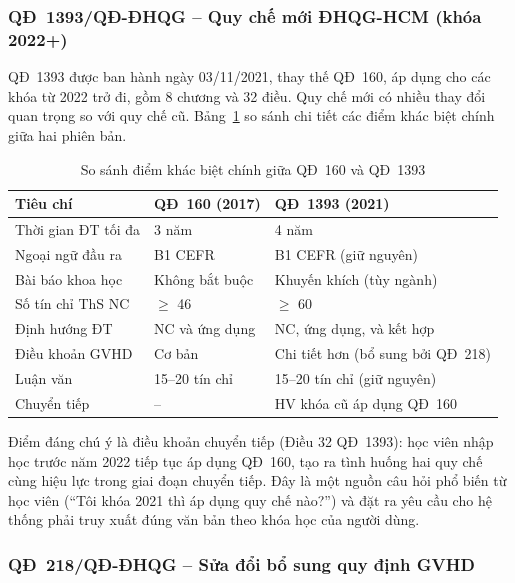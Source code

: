 \subsubsection*{QĐ~1393/QĐ-ĐHQG -- Quy chế mới ĐHQG-HCM (khóa 2022+)}

QĐ~1393 được ban hành ngày 03/11/2021, thay thế QĐ~160, áp dụng cho các khóa từ
2022 trở đi, gồm 8 chương và 32 điều. Quy chế mới có nhiều thay đổi quan trọng so
với quy chế cũ. Bảng~\ref{tab:qd160_vs_qd1393} so sánh chi tiết các điểm khác biệt
chính giữa hai phiên bản.

\begin{table}[htbp]
    \centering
    \caption{So sánh điểm khác biệt chính giữa QĐ~160 và QĐ~1393}
    \label{tab:qd160_vs_qd1393}
    \begin{tabular}{lp{4.5cm}p{4.5cm}}
        \toprule
        \textbf{Tiêu chí} & \textbf{QĐ~160 (2017)} & \textbf{QĐ~1393 (2021)} \\
        \midrule
        Thời gian ĐT tối đa & 3 năm & 4 năm \\
        Ngoại ngữ đầu ra & B1 CEFR & B1 CEFR (giữ nguyên) \\
        Bài báo khoa học & Không bắt buộc & Khuyến khích (tùy ngành) \\
        Số tín chỉ ThS NC & $\geq$ 46 & $\geq$ 60 \\
        Định hướng ĐT & NC và ứng dụng & NC, ứng dụng, và kết hợp \\
        Điều khoản GVHD & Cơ bản & Chi tiết hơn (bổ sung bởi QĐ~218) \\
        Luận văn & 15--20 tín chỉ & 15--20 tín chỉ (giữ nguyên) \\
        Chuyển tiếp & -- & HV khóa cũ áp dụng QĐ~160 \\
        \bottomrule
    \end{tabular}
\end{table}

Điểm đáng chú ý là điều khoản chuyển tiếp (Điều 32 QĐ~1393): học viên nhập học
trước năm 2022 tiếp tục áp dụng QĐ~160, tạo ra tình huống hai quy chế cùng hiệu
lực trong giai đoạn chuyển tiếp. Đây là một nguồn câu hỏi phổ biến từ học viên
(``Tôi khóa 2021 thì áp dụng quy chế nào?'') và đặt ra yêu cầu cho hệ thống phải
truy xuất đúng văn bản theo khóa học của người dùng.

\subsubsection*{QĐ~218/QĐ-ĐHQG -- Sửa đổi bổ sung quy định GVHD}

